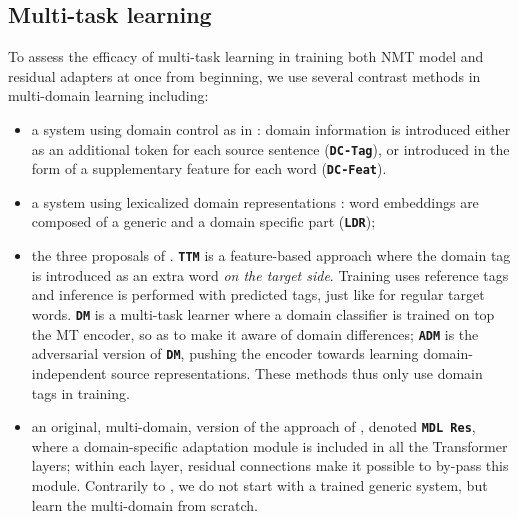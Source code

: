 \documentclass[11pt,a4paper]{article}
\newcommand{\fyDone}[1]{\done[FY]\Todo[FY:]{\textcolor{orange}{#1}}}
\newcommand{\system}[1]{\texttt{\textbf{#1}}}
\begin{document}
\subsection{Multi-task learning}
To assess the efficacy of multi-task learning in training both NMT model and residual adapters at once from beginning, we use several contrast methods in multi-domain learning including:
\begin{itemize}
\item a system using domain control as in \cite{Kobus17domaincontrol}: domain information is introduced either as an additional token for each source sentence (\system{DC-Tag}), or introduced in the form of a supplementary feature for each word (\system{DC-Feat}).
\item a system using lexicalized domain representations \cite{Pham19generic}: word embeddings are composed of a generic and a domain specific part (\system{LDR});
\item the three proposals of . \system{TTM} is a feature-based approach where the domain tag is introduced as an extra word \textsl{on the target side}. Training uses reference tags and inference is performed with predicted tags, just like for regular target words. \system{DM} is a multi-task learner where a domain classifier is trained on top the MT encoder, so as to make it aware of domain differences; \system{ADM} is the adversarial version of \system{DM}, pushing the encoder towards learning domain-independent source representations. These methods thus only use domain tags in training.
\item an original, multi-domain, version of the approach of , denoted \system{MDL Res}, where a domain-specific adaptation module is included in all the Transformer layers; within each layer, residual connections make it possible to by-pass this module. Contrarily to \cite{Bapna19simple}, we do not start with a trained generic system, but learn the multi-domain from scratch.\fyDone{Check this.}
\end{itemize}
\end{document}
